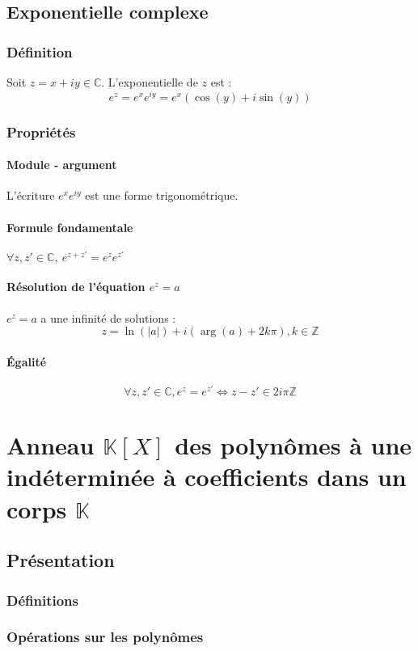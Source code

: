 \documentclass[12pt,a4paper,french]{book}
\begin{document}
	\section{Exponentielle complexe}
		\subsection{Définition}
		Soit $z = x+iy \in \mathbb{C}.$ L'exponentielle de $z$ est :
		\[e^{z} = e^{x}e^{iy} = e^{x}(\cos(y)+i\sin(y))\] 
		\subsection{Propriétés}
			\subsubsection{Module - argument}
			L'écriture $e^{x}e^{iy}$ est une forme trigonométrique.
			\subsubsection{Formule fondamentale}
			$\forall z,z' \in \mathbb{C}, \ e^{z+z'} = e^{z}e^{z'}$
			\subsubsection{Résolution de l'équation $e^{z} = a$}
			$e^{z} = a$ a une infinité de solutions : \[z = \ln(\left|a\right|) + i(\arg(a)+2k\pi), k\in \mathbb{Z} \]
			\subsubsection{Égalité}
			\[\forall z,z' \in \mathbb{C}, e^{z} = e^{z'} \Leftrightarrow z-z' \in 2i\pi\mathbb{Z}\]
			
		
\chapter{Anneau $\mathbb{K}[X]$ des polynômes à une indéterminée à coefficients dans un corps $\mathbb{K}$}
	\section{Présentation}
		\subsection{Définitions}
		\subsection{Opérations sur les polynômes}
\end{document}
